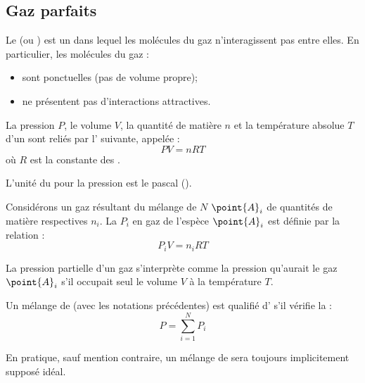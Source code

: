 \subsection{Gaz parfaits}

\begin{definition}
Le  (ou ) est un  dans lequel les molécules du gaz n'interagissent pas entre elles. En particulier, les molécules du gaz :
\begin{itemize}
\item sont ponctuelles (pas de volume propre);
\item ne présentent pas d'interactions attractives.
\end{itemize}
\end{definition}

\begin{propriete}[admis]
La pression $P$, le volume $V$, la quantité de matière $n$ et la température absolue $T$ d'un  sont reliés par l' suivante, appelée  :
\[PV = nRT\]
où $R$ est la constante des .
\end{propriete}

\begin{attention}
L'unité du  pour la pression est le pascal (\pascal).
\end{attention}

\begin{definition}
Considérons un gaz résultant du mélange de $N$  $\point{A}_i$ de quantités de matière respectives $n_i$. La  $P_i$ en gaz de l'espèce $\point{A}_i$ est définie par la relation :
\[P_i V = n_i RT\]
\end{definition}

\begin{remarque}
La pression partielle d'un gaz s'interprète comme la pression qu'aurait le gaz $\point{A}_i$ s'il occupait seul le volume $V$ à la température $T$.
\end{remarque}

\begin{definition}
Un mélange de  (avec les notations précédentes) est qualifié d' s'il vérifie la  :
\[P = \sum_{i = 1}^N P_i\]
\end{definition}

\begin{remarque}
En pratique, sauf mention contraire, un mélange de  sera toujours implicitement supposé idéal.
\end{remarque}


